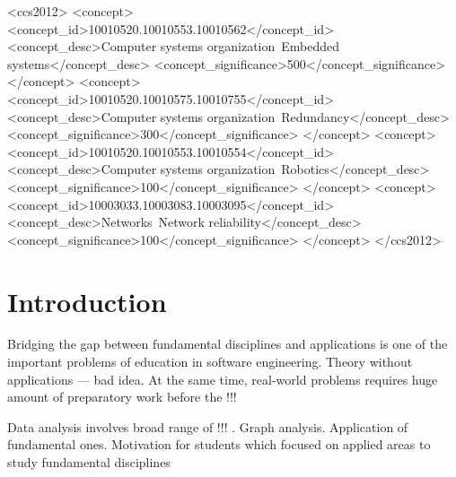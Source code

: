 \documentclass[sigconf]{acmart}
\begin{document}
\begin{CCSXML}
<ccs2012>
 <concept>
  <concept_id>10010520.10010553.10010562</concept_id>
  <concept_desc>Computer systems organization~Embedded systems</concept_desc>
  <concept_significance>500</concept_significance>
 </concept>
 <concept>
  <concept_id>10010520.10010575.10010755</concept_id>
  <concept_desc>Computer systems organization~Redundancy</concept_desc>
  <concept_significance>300</concept_significance>
 </concept>
 <concept>
  <concept_id>10010520.10010553.10010554</concept_id>
  <concept_desc>Computer systems organization~Robotics</concept_desc>
  <concept_significance>100</concept_significance>
 </concept>
 <concept>
  <concept_id>10003033.10003083.10003095</concept_id>
  <concept_desc>Networks~Network reliability</concept_desc>
  <concept_significance>100</concept_significance>
 </concept>
</ccs2012>
\end{CCSXML}




\maketitle

\section{Introduction}

Bridging the gap between fundamental disciplines and applications is one of the important problems of education in software engineering.
Theory without applications --- bad idea.
At the same time, real-world problems requires huge amount of preparatory work before the !!!

Data analysis involves broad range of !!! .
Graph analysis.
Application of fundamental ones.
Motivation for students which focused on applied areas to study fundamental disciplines 
\end{document}
